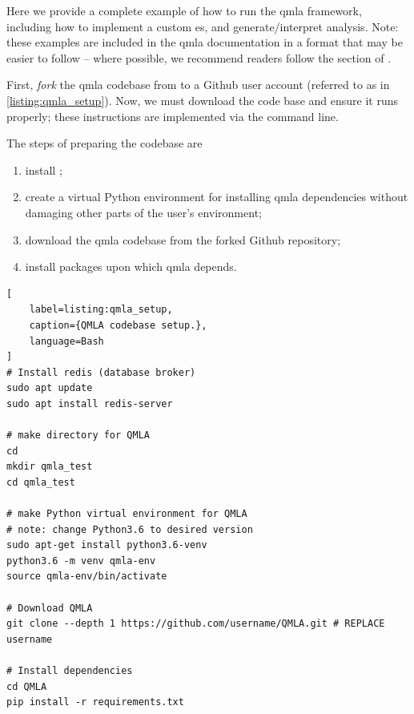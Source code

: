 Here we provide a complete example of how to run the \acrfull{qmla} framework, 
    including how to implement a custom \acrfull{es}, 
    and generate/interpret analysis.
Note: these examples are included in the \gls{qmla} documentation in a format that may be easier to follow -- 
    where possible, we recommend readers follow the  section of \cite{qmla_docs}.

\par 

First, \emph{fork} the \gls{qmla} codebase from \cite{flynn2021QMLA}
    to a Github user account (referred to as  in \cref{listing:qmla_setup}).
Now, we must download the code base and ensure it runs properly;
    these instructions are implemented via the command line\footnotemark. 

The steps of preparing the codebase are 
\begin{enumerate}
\item install ;
\item create a virtual Python environment for installing \gls{qmla} dependencies without damaging other parts of 
the user's environment;
\item download the \gls{qmla} codebase from 
    the forked Github repository;
\item install packages upon which \gls{qmla} depends. 
\end{enumerate}
    
\begin{lstlisting}[
    label=listing:qmla_setup,
    caption={QMLA codebase setup.},
    language=Bash
]
# Install redis (database broker)
sudo apt update
sudo apt install redis-server
 
# make directory for QMLA
cd
mkdir qmla_test
cd qmla_test

# make Python virtual environment for QMLA
# note: change Python3.6 to desired version
sudo apt-get install python3.6-venv 
python3.6 -m venv qmla-env    
source qmla-env/bin/activate

# Download QMLA
git clone --depth 1 https://github.com/username/QMLA.git # REPLACE username

# Install dependencies
cd QMLA 
pip install -r requirements.txt 
\end{lstlisting}

